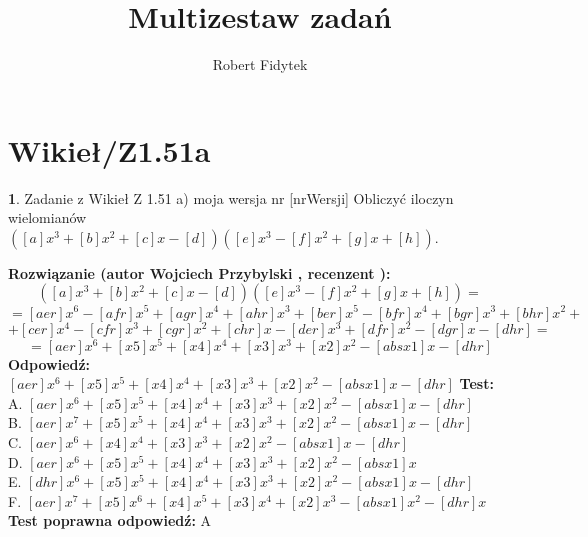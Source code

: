 \documentclass[12pt, a4paper]{article}
\title{Multizestaw zadań}
\author{Robert Fidytek}
\date{}
\theoremstyle{definition} %
\newtheorem{zad}{}
\newcommand{\kategoria}[1]{\section{#1}} %
\newcommand{\zadStart}[1]{\begin{zad}#1\newline} %
\newcommand{\zadStop}{\end{zad}}   %
\newcommand{\rozwStart}[2]{\noindent \textbf{Rozwiązanie (autor #1 , recenzent #2): }\newline} %
\newcommand{\rozwStop}{\newline}                                            %
\newcommand{\odpStart}{\noindent \textbf{Odpowiedź:}\newline}    %
\newcommand{\odpStop}{\newline}                                             %
\newcommand{\testStart}{\noindent \textbf{Test:}\newline} %
\newcommand{\testStop}{\newline} %
\newcommand{\kluczStart}{\noindent \textbf{Test poprawna odpowiedź:}\newline} %
\newcommand{\kluczStop}{\newline} %
\begin{document}
\maketitle


\kategoria{Wikieł/Z1.51a}
\zadStart{Zadanie z Wikieł Z 1.51 a) moja wersja nr [nrWersji]}
Obliczyć iloczyn wielomianów $([a]x^{3}+[b]x^{2}+[c]x-[d])([e]x^{3}-[f]x^{2}+[g]x+[h])$.
\zadStop
\rozwStart{Wojciech Przybylski}{}
$$([a]x^{3}+[b]x^{2}+[c]x-[d])([e]x^{3}-[f]x^{2}+[g]x+[h])=$$
$$=[aer]x^{6}-[afr]x^{5}+[agr]x^{4}+[ahr]x^{3}+[ber]x^{5}-[bfr]x^{4}+[bgr]x^{3}+[bhr]x^{2}+$$
$$+[cer]x^{4}-[cfr]x^{3}+[cgr]x^{2}+[chr]x-[der]x^{3}+[dfr]x^{2}-[dgr]x-[dhr]=$$
$$=[aer]x^{6}+[x5]x^{5}+[x4]x^{4}+[x3]x^{3}+[x2]x^{2}-[absx1]x-[dhr]$$
\rozwStop
\odpStart
$[aer]x^{6}+[x5]x^{5}+[x4]x^{4}+[x3]x^{3}+[x2]x^{2}-[absx1]x-[dhr]$
\odpStop
\testStart
A. $[aer]x^{6}+[x5]x^{5}+[x4]x^{4}+[x3]x^{3}+[x2]x^{2}-[absx1]x-[dhr]$\\
B. $[aer]x^{7}+[x5]x^{5}+[x4]x^{4}+[x3]x^{3}+[x2]x^{2}-[absx1]x-[dhr]$\\
C. $[aer]x^{6}+[x4]x^{4}+[x3]x^{3}+[x2]x^{2}-[absx1]x-[dhr]$\\
D. $[aer]x^{6}+[x5]x^{5}+[x4]x^{4}+[x3]x^{3}+[x2]x^{2}-[absx1]x$\\
E. $[dhr]x^{6}+[x5]x^{5}+[x4]x^{4}+[x3]x^{3}+[x2]x^{2}-[absx1]x-[dhr]$\\
F. $[aer]x^{7}+[x5]x^{6}+[x4]x^{5}+[x3]x^{4}+[x2]x^{3}-[absx1]x^{2}-[dhr]x$
\testStop
\kluczStart
A
\kluczStop
\end{document}
